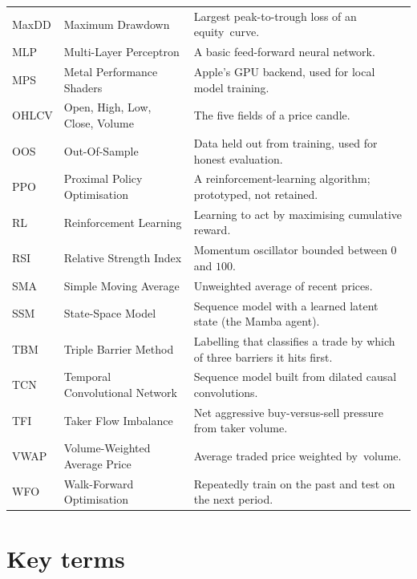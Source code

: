 \begin{onehalfspacing}
\begin{longtable}{@{}l >{\raggedright\arraybackslash\hyphenpenalty=10000\exhyphenpenalty=10000}p{3.5cm} >{\raggedright\arraybackslash\hyphenpenalty=10000\exhyphenpenalty=10000}p{6.6cm}@{}}
MaxDD & Maximum Drawdown                   & Largest peak-to-trough loss of an equity~curve. \\
MLP   & Multi-Layer Perceptron             & A basic feed-forward neural network. \\
MPS   & Metal Performance Shaders          & Apple's GPU backend, used for local model training. \\
OHLCV & Open, High, Low, Close, Volume     & The five fields of a price candle. \\
OOS   & Out-Of-Sample                      & Data held out from training, used for honest evaluation. \\
PPO   & Proximal Policy Optimisation       & A reinforcement-learning algorithm; prototyped, not retained. \\
RL    & Reinforcement Learning             & Learning to act by maximising cumulative reward. \\
RSI   & Relative Strength Index            & Momentum oscillator bounded between $0$ and $100$. \\
SMA   & Simple Moving Average              & Unweighted average of recent prices. \\
SSM   & State-Space Model                  & Sequence model with a learned latent state (the Mamba agent). \\
TBM   & Triple Barrier Method              & Labelling that classifies a trade by which of three barriers it hits first. \\
TCN   & Temporal Convolutional Network     & Sequence model built from dilated causal convolutions. \\
TFI   & Taker Flow Imbalance               & Net aggressive buy-versus-sell pressure from taker volume. \\
VWAP  & Volume-Weighted Average Price      & Average traded price weighted by~volume. \\
WFO   & Walk-Forward Optimisation          & Repeatedly train on the past and test on the next period. \\
\bottomrule
\end{longtable}

\section*{Key terms}


\end{onehalfspacing}
